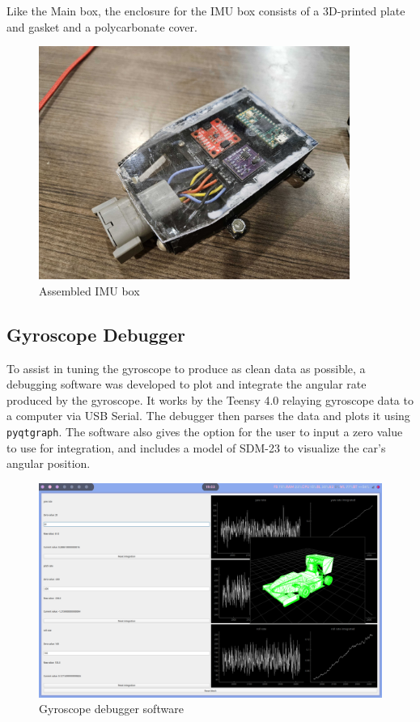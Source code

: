 Like the Main box, the enclosure for the IMU box consists of a 3D-printed plate and gasket and a polycarbonate cover.
\begin{figure}[H]
    \centering
    \includegraphics[width=4in]{images/imuimu.jpg}
    \caption{Assembled IMU box}
    \label{fig:sdm23imubox}
\end{figure}
\subsection{Gyroscope Debugger}
To assist in tuning the gyroscope to produce as clean data as possible, a debugging software was developed to plot and integrate the angular rate produced by the gyroscope.
It works by the Teensy 4.0 relaying gyroscope data to a computer via USB Serial.
The debugger then parses the data and plots it using \texttt{pyqtgraph}.
The software also gives the option for the user to input a zero value to use for integration, and includes a model of SDM-23 to visualize the car's angular position.
\begin{figure}[H]
    \centering
    \includegraphics[width=7in]{images/debug.png}
    \caption{Gyroscope debugger software}
    \label{fig:deb}
\end{figure}

